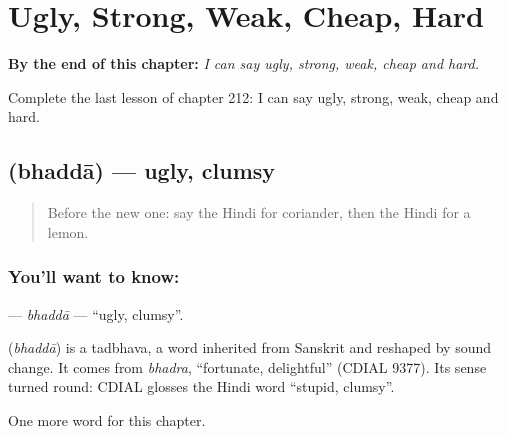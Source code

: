 
\chapter{Ugly, Strong, Weak, Cheap, Hard}
\label{ch:hi-ugly-strong-weak-cheap-hard}

\begin{chapteropening}
\textbf{By the end of this chapter:} \emph{I can say ugly, strong, weak, cheap and hard.}

Complete the last lesson of chapter 212: I can say ugly, strong, weak, cheap and hard.
\end{chapteropening}

\section[\texorpdfstring{\hi{भद्दा} (bhaddā)}{भद्दा (bhaddā)}]{ (bhaddā) — ugly, clumsy}

\label{lesson:HI-C212-bhadda}



\begin{quote}
Before the new one: say the Hindi for coriander, then the Hindi for a lemon.
\end{quote}

\subsection*{You'll want to know: }
\textbf{} — \emph{bhaddā} — \textquotedblleft{}ugly, clumsy\textquotedblright{}.

\begin{cousinweb}
\textbf{} (\emph{bhaddā}) is a tadbhava, a word inherited from Sanskrit and reshaped by sound change. It comes from \emph{bhadra}, \textquotedblleft{}fortunate, delightful\textquotedblright{} (CDIAL 9377). Its sense turned round: CDIAL glosses the Hindi word \textquotedblleft{}stupid, clumsy\textquotedblright{}.
\end{cousinweb}

\begin{grammarlens}[title={What you've built}]
One more word for this chapter.
\end{grammarlens}


